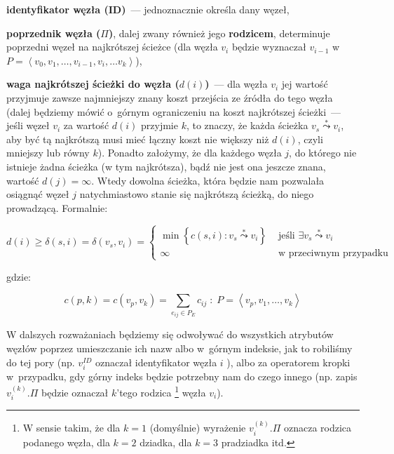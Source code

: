 \begin{myitemize}

\item \textbf{identyfikator węzła (ID)}~--- jednoznacznie określa dany węzeł,

\item \textbf{poprzednik węzła ($\Pi$)}, dalej zwany również jego \textbf{rodzicem}, determinuje poprzedni węzeł na najkrótszej ścieżce (dla węzła $v_{i}$ będzie wyznaczał $v_{i-1}$ w~$P = \left \langle v_{0}, v_{1}, \ldots, v_{i-1}, v_{i}, \ldots v_{k} \right \rangle $),

\item \textbf{waga najkrótszej ścieżki do węzła ($d \left( i \right) $)}~--- dla węzła $v_{i}$ jej wartość przyjmuje zawsze najmniejszy znany koszt przejścia ze źródła do tego węzła (dalej będziemy mówić o~górnym ograniczeniu na koszt najkrótszej ścieżki~--- jeśli węzeł $v_{i}$ za wartość $ d \left( i \right) $ przyjmie $k$, to znaczy, że każda ścieżka $v_{s} \overset{*}\leadsto v_{i}$, aby być tą najkrótszą musi mieć łączny koszt nie większy niż $ d \left( i \right) $, czyli mniejszy lub równy $k$). Ponadto założymy, że dla każdego węzła $j$, do którego nie istnieje żadna ścieżka (w tym najkrótsza), bądź nie jest ona jeszcze znana, wartość $d \left( j \right) = \infty$. Wtedy dowolna ścieżka, która będzie nam pozwalała osiągnąć węzeł $j$ natychmiastowo stanie się najkrótszą ścieżką, do niego prowadzącą. Formalnie:

\begin{equation}
	d \left( i \right) \geqslant \delta \left ( s, i \right ) = \delta \left ( v_{s}, v_{i} \right ) = 
	\begin{cases}
	 \min \left\{ c \left( s,i \right ) : v_{s} \overset{*}\leadsto v_{i} \right\} & \text{ jeśli } \exists v_{s} \overset{*}\leadsto v_{i} \\ 
	 \infty & \text{ w~przeciwnym przypadku }
	\end{cases}
\end{equation}

gdzie:

\begin{equation}\label{eq:sumCost}
c \left( p,k \right ) = c \left( v_{p}, v_{k} \right ) = \sum_{e_{ij} \in P_{E}} c_{ij} \; : \; P = \left \langle v_{p}, v_{1}, \ldots, v_{k} \right \rangle 
\end{equation}

\end{myitemize}

W dalszych rozważaniach będziemy się odwoływać do wszystkich atrybutów węzłów poprzez umieszczanie ich nazw albo w~górnym indeksie, jak to robiliśmy do tej pory (np. $v_{i}^{ID}$ oznaczał identyfikator węzła $i$ ), albo za operatorem kropki w~przypadku, gdy górny indeks będzie potrzebny nam do czego innego (np. zapis $v_{i}^{ \left( k \right) }.\Pi$ będzie oznaczał $k$'tego rodzica \footnote{W sensie takim, że dla $k=1$ (domyślnie) wyrażenie $v_{i}^{ \left( k \right) }.\Pi$ oznacza rodzica podanego węzła, dla $k=2$ dziadka, dla $k=3$ pradziadka itd.} węzła $v_{i}$).

